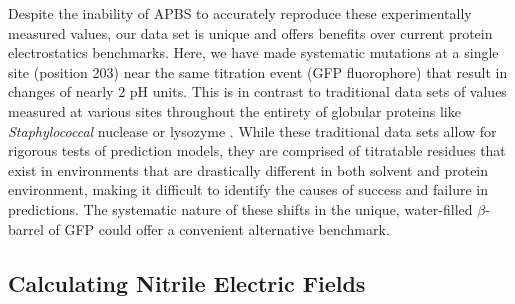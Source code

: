 Despite the inability of APBS to accurately reproduce these experimentally measured \pKa{} values, our data set is unique and offers benefits over current protein electrostatics benchmarks.
Here, we have made systematic mutations at a single site (position 203) near the same titration event (GFP fluorophore) that result in \pKa{} changes of nearly 2 pH units.
This is in contrast to traditional data sets of \pKa{} values measured at various sites throughout the entirety of globular proteins like \emph{Staphylococcal} nuclease or lysozyme \cite{Nielsen2011, Castaneda2009, Merz1991}.
While these traditional data sets allow for rigorous tests of \pKa{} prediction models, they are comprised of titratable residues that exist in environments that are drastically different in both solvent and protein environment, making it difficult to identify the causes of success and failure in \pKa{} predictions.
The systematic nature of these \pKa{} shifts in the unique, water-filled $\beta$-barrel of GFP could offer a convenient alternative benchmark. 

\subsection{Calculating Nitrile Electric Fields}

